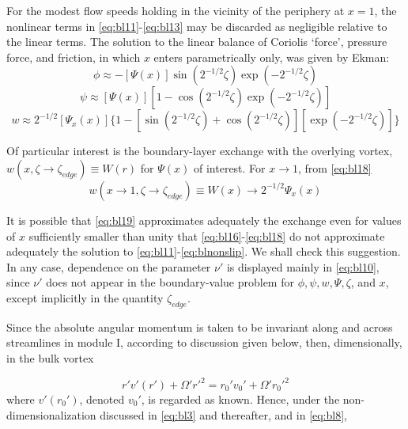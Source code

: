 \documentclass[preprint, prX]{revtex4}
\begin{document}
For the modest flow speeds holding in the vicinity of the periphery at $x = 1$, the nonlinear terms in \eqref{eq:bl11}-\eqref{eq:bl13} may be discarded as negligible relative to the linear terms. The solution to the linear balance of Coriolis `force', pressure force, and friction, in which $x$ enters parametrically only, was given by Ekman:
\begin{equation}
\phi \approx -[\Psi(x)]\sin(2^{-1/2}\zeta)\exp(-2^{-1/2}\zeta)
\label{eq:bl16}
\end{equation}
\begin{equation}
\psi \approx [\Psi(x)][1-\cos( 2^{-1/2}\zeta)\exp(-2^{-1/2}\zeta)]
\end{equation}
\begin{equation}
w \approx 2^{-1/2} [\Psi_x(x)]\{1-[\sin(2^{-1/2}\zeta) + \cos(2^{-1/2} \zeta)][\exp(-2^{-1/2}\zeta)]   \}
\label{eq:bl18}
\end{equation}

Of particular interest is the boundary-layer exchange with the overlying vortex,
$w(x, \zeta \rightarrow \zeta_{edge} ) \equiv W(r)$ for $\Psi(x)$ of interest. For $x \rightarrow 1$, from \eqref{eq:bl18}
\begin{equation}
w(x\rightarrow 1, \zeta \rightarrow \zeta_{edge}) \equiv W(x) \rightarrow 2^{-1/2} \Psi_x(x)
\label{eq:bl19}
\end{equation}

It is possible that \eqref{eq:bl19} approximates adequately the
exchange even for values of $x$ sufficiently smaller than unity that \eqref{eq:bl16}-\eqref{eq:bl18} do not approximate adequately the solution to \eqref{eq:bl11}-\eqref{eq:blnonslip}. We shall check this suggestion. In any case, dependence on the parameter $\nu'$ is displayed mainly in \eqref{eq:bl10}, since $\nu'$ does not appear in the boundary-value problem for $\phi, \psi, w, \Psi, \zeta$, and $x$, except implicitly in the quantity $\zeta_{edge}$. 

Since the absolute angular momentum is taken to be invariant along and across streamlines in module I, according to discussion given below, then, dimensionally, in the bulk
vortex

\begin{equation}
r'v'(r') + \Omega' r'^2 = r_0' v_0' + \Omega' r_0'^2
\end{equation}
where $v'(r_0')$,  denoted $v_0'$, is regarded as known. Hence, under the non-dimensionalization discussed in \eqref{eq:bl3} and thereafter, and in \eqref{eq:bl8},
\end{document}
